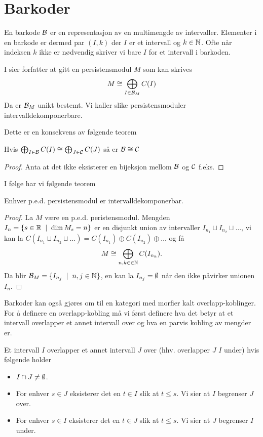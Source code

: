 \section{Barkoder}
En barkode $\mathcal{B}$ er en representasjon av en multimengde av intervaller. Elementer i en barkode er dermed par
$(I,k)$ der $I$ er et intervall og $k\in\mathbb{N}$. Ofte når indeksen $k$ ikke er nødvendig skriver vi bare $I$ for et intervall i barkoden.

I \cite{Bauer2015a} sier forfatter at gitt en persistensmodul $M$ som kan skrives
\[M\cong\bigoplus_{I\in\mathcal{B}_M}C(I)\]
Da er $\mathcal{B}_M$ unikt bestemt. Vi kaller slike persistensmoduler intervalldekomponerbare.

Dette er en konsekvens av følgende teorem

\begin{teorem}\label{Thrm:label}
    Hvis $\bigoplus_{I\in\mathcal{B}}C(I)\cong\bigoplus_{J\in\mathcal{C}} C(J)$ så er $\mathcal{B}\cong\mathcal{C}$
\end{teorem}
\begin{proof}
Anta at det ikke eksisterer en bijeksjon mellom $\mathcal{B}$ og $\mathcal{C}$ f.eks. 
\end{proof}

I følge \cite{Bauer2015a} har vi følgende teorem
\begin{teorem}\label{Thrm:thrm2.1}
Enhver p.e.d. persistensmodul er intervalldekomponerbar.
\end{teorem}
\begin{proof}
La $M$ være en p.e.d. peristensmodul. Mengden $I_n = \{s\in\mathbb{R}\;\mid\;\dim M_s=n\}$ er en disjunkt union av intervaller $I_{n_1}\sqcup I_{n_2}\sqcup\dots$, vi kan la $C(I_{n_1}\sqcup I_{n_2}\sqcup\dots)=C(I_{n_1})\oplus C(I_{n_2})\oplus\dots$ og få
\[M\cong \bigoplus_{n,k\in\in\mathbb{N}} C(I_{n_k}).\]
Da blir $\mathcal{B}_M = \{I_{n_j}\;\mid\; n,j\in\mathbb{N}\}$, en kan la $I_{n_j}=\emptyset$ når den ikke påvirker unionen $I_n$. 
\end{proof}

Barkoder kan også gjøres om til en kategori med morfier kalt overlapp-koblinger. For å definere en 
overlapp-kobling må vi først definere hva det betyr at et intervall overlapper et annet intervall over og hva en parvis kobling av mengder er.
\pagebreak
\begin{definisjon}
    Et intervall $I$ overlapper et annet intervall $J$ over (hhv. overlapper $J$  $I$ under) hvis følgende holder
    \begin{itemize}
        \item $I\cap J\neq\emptyset$.
        \item For enhver $s\in J$ eksisterer det en $t\in I$ slik at $t\leq s$. Vi sier at $I$ begrenser $J$ over.
        \item For enhver $s\in I$ eksisterer det en $t\in J$ slik at $t\leq s$. Vi sier at $J$ begrenser $I$ under.
    \end{itemize}
\end{definisjon}

